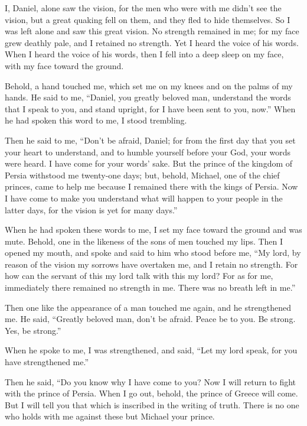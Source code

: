  I, Daniel, alone saw the vision, for the men who were
with me didn't see the vision, but a great quaking fell on them, and
they fled to hide themselves.  So I was left alone and saw
this great vision. No strength remained in me; for my face grew deathly
pale, and I retained no strength.  Yet I heard the voice
of his words. When I heard the voice of his words, then I fell into a
deep sleep on my face, with my face toward the ground.

 Behold, a hand touched me, which set me on my knees and
on the palms of my hands.  He said to me, ``Daniel, you
greatly beloved man, understand the words that I speak to you, and stand
upright, for I have been sent to you, now.'' When he had spoken this
word to me, I stood trembling.

 Then he said to me, ``Don't be afraid, Daniel; for from
the first day that you set your heart to understand, and to humble
yourself before your God, your words were heard. I have come for your
words' sake.  But the prince of the kingdom of Persia
withstood me twenty-one days; but, behold, Michael, one of the chief
princes, came to help me because I remained there with the kings of
Persia.  Now I have come to make you understand what will
happen to your people in the latter days, for the vision is yet for many
days.''

 When he had spoken these words to me, I set my face
toward the ground and was mute.  Behold, one in the
likeness of the sons of men touched my lips. Then I opened my mouth, and
spoke and said to him who stood before me, ``My lord, by reason of the
vision my sorrows have overtaken me, and I retain no strength.
 For how can the servant of this my lord talk with this
my lord? For as for me, immediately there remained no strength in me.
There was no breath left in me.''

 Then one like the appearance of a man touched me again,
and he strengthened me.  He said, ``Greatly beloved man,
don't be afraid. Peace be to you. Be strong. Yes, be strong.''

When he spoke to me, I was strengthened, and said, ``Let my lord speak,
for you have strengthened me.''

 Then he said, ``Do you know why I have come to you? Now
I will return to fight with the prince of Persia. When I go out, behold,
the prince of Greece will come.  But I will tell you that
which is inscribed in the writing of truth. There is no one who holds
with me against these but Michael your prince.

